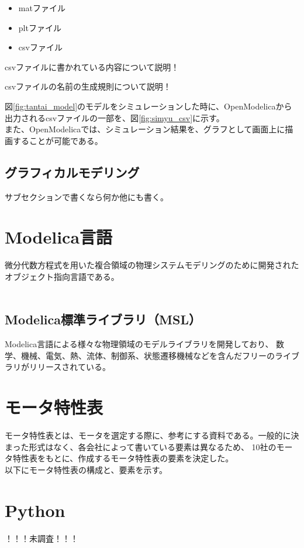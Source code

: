 \begin{itemize}
    \item matファイル
    \item pltファイル
    \item csvファイル
\end{itemize}

csvファイルに書かれている内容について説明！

csvファイルの名前の生成規則について説明！

図\ref{fig:tantai_model}のモデルをシミュレーションした時に、OpenModelicaから出力されるcsvファイルの一部を、図\ref{fig:simyu_csv}に示す。\\


また、OpenModelicaでは、シミュレーション結果を、グラフとして画面上に描画することが可能である。

\subsection{グラフィカルモデリング}\label{glafical}
サブセクションで書くなら何か他にも書く。

\section{Modelica言語}\label{modelica}
微分代数方程式を用いた複合領域の物理システムモデリングのために開発されたオブジェクト指向言語である。\\
　\subsection{Modelica標準ライブラリ（MSL）}\label{MSL}
        Modelica言語による様々な物理領域のモデルライブラリを開発しており、
        数学、機械、電気、熱、流体、制御系、状態遷移機械などを含んだフリーのライブラリがリリースされている。

\section{モータ特性表}\label{mortoku}
モータ特性表とは、モータを選定する際に、参考にする資料である。一般的に決まった形式はなく、各会社によって書いている要素は異なるため、
10社のモータ特性表をもとに、作成するモータ特性表の要素を決定した。\\
以下にモータ特性表の構成と、要素を示す。





  \section{Python}\label{python}
  ！！！未調査！！！